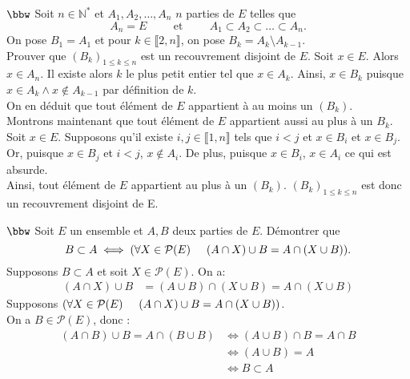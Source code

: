 \documentclass[11pt]{article}
\begin{document}
\begin{exercice}{$\bbw$}{}
    Soit $n \in \mathbb{N}^*$ et $A_1, A_2, \dots, A_n$ $n$ parties de $E$ telles que
    \begin{equation*}
        A_n = E \hspace{1cm} \text{et} \hspace{1cm} A_1 \subset A_2 \subset \dots \subset A_n.
    \end{equation*}
    On pose $B_1=A_1$ et pour $k \in \llbracket{2, n}\rrbracket$, on pose $B_k = A_k \setminus A_{k-1}$.\\
    Prouver que $(B_k)_{1 \leq k \leq n}$ est un recouvrement disjoint de $E$.
    \tcblower
    Soit $x \in E$. Alors $x \in A_n$. Il existe alors $k$ le plus petit entier tel que $x \in A_k$. Ainsi, $x \in B_k$ puisque $x \in A_k \wedge x \notin A_{k-1}$ par définition de $k$.\\
    On en déduit que tout élément de $E$ appartient à au moins un $(B_k)$.\\[0.25cm]
    Montrons maintenant que tout élément de $E$ appartient aussi au plus à un $B_k$.\\
    Soit $x \in E$. Supposons qu'il existe $i,j \in \llbracket1,n\rrbracket$ tels que $i < j$ et $x \in B_i$ et $x \in B_j$.\\
    Or, puisque $x \in B_j$ et $i<j$, $x \notin A_i$. De plus, puisque $x \in B_i$, $x \in A_i$ ce qui est absurde.\\
    Ainsi, tout élément de $E$ appartient au plus à un $(B_k)$.\n
    $(B_k)_{1 \leq k \leq n}$ est donc un recouvrement disjoint de E.
\end{exercice}

\begin{exercice}{$\bbw$}{}
    Soit $E$ un ensemble et $A,B$ deux parties de $E$. Démontrer que
    \begin{equation*}
        B \subset A \iff (\forall X \in \mathcal{P}(E) \hspace{0.5cm} (A \cap X) \cup B = A \cap (X \cup B)).
    \end{equation*}
    \tcblower
    Supposons $B \subset A$ et soit $X \in \mathcal{P}(E)$. On a:
    \begin{align*}
        (A \cap X) \cup B &= (A \cup B) \cap (X \cup B) = A \cap (X \cup B)
    \end{align*}
    Supposons $(\forall X \in \mathcal{P}(E) \hspace{0.5cm} (A \cap X) \cup B = A \cap (X \cup B))$.\\
    On a $B \in \mathcal{P}(E)$, donc :
    \begin{align*}
        (A \cap B) \cup B = A \cap (B \cup B) &\iff (A \cup B) \cap B = A \cap B\\
        &\iff (A \cup B) = A\\
        &\iff B \subset A
    \end{align*}
\end{exercice}
\end{document}
